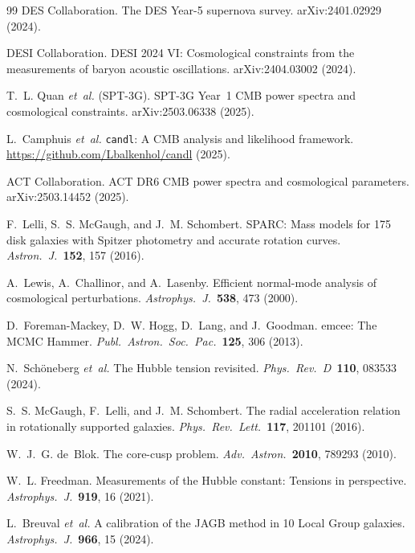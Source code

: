 \documentclass[12pt,a4paper]{article}
\begin{document}
\begin{thebibliography}{99}
DES Collaboration.
\newblock The DES Year-5 supernova survey.
\newblock arXiv:2401.02929 (2024).

DESI Collaboration.
\newblock DESI 2024 VI: Cosmological constraints from the measurements of baryon acoustic oscillations.
\newblock arXiv:2404.03002 (2024).

T.~L. Quan \textit{et~al.} (SPT-3G).
\newblock SPT-3G Year~1 CMB power spectra and cosmological constraints.
\newblock arXiv:2503.06338 (2025).

L.~Camphuis \textit{et~al.}
\newblock \texttt{candl}: A CMB analysis and likelihood framework.
\newblock \url{https://github.com/Lbalkenhol/candl} (2025).

ACT Collaboration.
\newblock ACT DR6 CMB power spectra and cosmological parameters.
\newblock arXiv:2503.14452 (2025).

F.~Lelli, S.~S. McGaugh, and J.~M. Schombert.
\newblock SPARC: Mass models for 175 disk galaxies with Spitzer photometry and accurate rotation curves.
\newblock \textit{Astron.\ J.}\ \textbf{152}, 157 (2016).

A.~Lewis, A.~Challinor, and A.~Lasenby.
\newblock Efficient normal-mode analysis of cosmological perturbations.
\newblock \textit{Astrophys.\ J.}\ \textbf{538}, 473 (2000).

D.~Foreman-Mackey, D.~W. Hogg, D.~Lang, and J.~Goodman.
\newblock emcee: The MCMC Hammer.
\newblock \textit{Publ.\ Astron.\ Soc.\ Pac.}\ \textbf{125}, 306 (2013).

N.~Sch\"{o}neberg \textit{et~al.}
\newblock The Hubble tension revisited.
\newblock \textit{Phys.\ Rev.\ D}\ \textbf{110}, 083533 (2024).

S.~S. McGaugh, F.~Lelli, and J.~M. Schombert.
\newblock The radial acceleration relation in rotationally supported galaxies.
\newblock \textit{Phys.\ Rev.\ Lett.}\ \textbf{117}, 201101 (2016).

W.~J.~G. de~Blok.
\newblock The core-cusp problem.
\newblock \textit{Adv.\ Astron.}\ \textbf{2010}, 789293 (2010).

W.~L. Freedman.
\newblock Measurements of the Hubble constant: Tensions in perspective.
\newblock \textit{Astrophys.\ J.}\ \textbf{919}, 16 (2021).

L.~Breuval \textit{et~al.}
\newblock A calibration of the JAGB method in 10 Local Group galaxies.
\newblock \textit{Astrophys.\ J.}\ \textbf{966}, 15 (2024).


\end{thebibliography}
\end{document}
